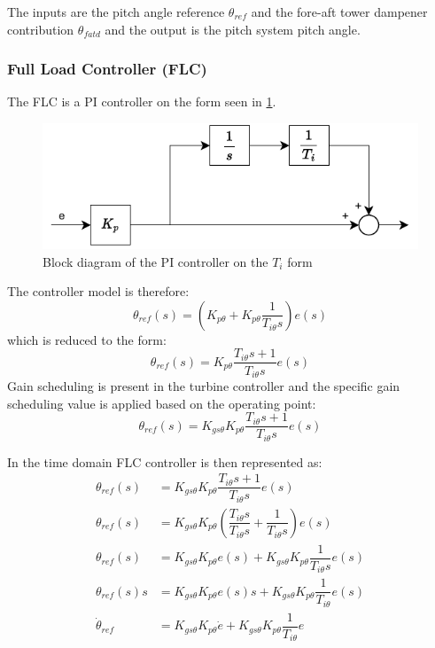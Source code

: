 The inputs are the pitch angle reference $ \theta_{ref} $ and the fore-aft tower dampener contribution $ \theta_{fatd} $ and the output is the pitch system pitch angle.


\subsubsection{Full Load Controller (FLC)} \label{sec:mod_wtLin_FLC}
The FLC is a PI controller on the form seen in \cref{fig:PIcontroller}.
\begin{figure}[h]
	\centering
	\includegraphics[width=0.5\linewidth]{Graphics/PiController.pdf}
	\caption{Block diagram of the PI controller on the \textit{$T_i$} form}
	\label{fig:PIcontroller}
\end{figure}
The controller model is therefore:
\begin{equation}\label{eq:wtlin_comp_flc_1}
	\theta_{ref}(s) = (K_{p \theta} + K_{p \theta} \dfrac{1}{T_{i \theta} s}) e(s)
\end{equation}
which is reduced to the form:
\begin{equation}\label{eq:wtlin_comp_flc_1}
	\theta_{ref}(s) = K_{p \theta}\dfrac{T_{i \theta} s + 1}{T_{i \theta} s} e(s)
\end{equation}
Gain scheduling is present in the turbine controller and the specific gain scheduling value is applied based on the operating point:
\begin{equation}\label{eq:wtlin_comp_flc_3}
	\theta_{ref}(s) = K_{gs \theta} K_{p \theta} \dfrac{T_{i \theta} s + 1}{T_{i \theta} s} e(s)
\end{equation}

In the time domain FLC controller is then represented as:
\begin{align}
	\theta_{ref}(s) & = K_{gs \theta} K_{p \theta} \dfrac{T_{i \theta} s + 1}{T_{i \theta} s} e(s) \\
	\theta_{ref}(s) & = K_{gs \theta} K_{p \theta} (\dfrac{T_{i \theta} s}{T_{i \theta} s} + \dfrac{1}{T_{i \theta} s}) e(s) \\
	\theta_{ref}(s) & = K_{gs \theta} K_{p \theta} e(s) +  K_{gs \theta} K_{p \theta} \dfrac{1}{T_{i \theta} s}e(s) \\
	\theta_{ref}(s) s & = K_{gs \theta} K_{p \theta} e(s) s +  K_{gs \theta} K_{p \theta} \dfrac{1}{T_{i \theta}}e(s) \\
	\dot{\theta}_{ref} & = K_{gs \theta} K_{p \theta} \dot{e} +  K_{gs \theta} K_{p \theta} \dfrac{1}{T_{i \theta}}e
\end{align}



